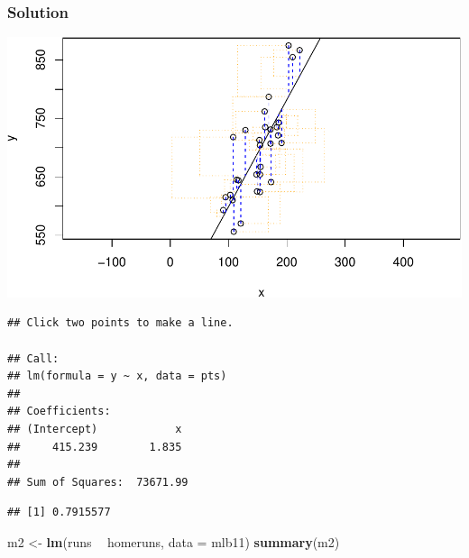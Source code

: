 \documentclass[]{article}
\newenvironment{Shaded}{\begin{snugshade}}{\end{snugshade}}
\newcommand{\KeywordTok}[1]{\textcolor[rgb]{0.13,0.29,0.53}{\textbf{#1}}}
\newcommand{\DataTypeTok}[1]{\textcolor[rgb]{0.13,0.29,0.53}{#1}}
\newcommand{\StringTok}[1]{\textcolor[rgb]{0.31,0.60,0.02}{#1}}
\newcommand{\OtherTok}[1]{\textcolor[rgb]{0.56,0.35,0.01}{#1}}
\newcommand{\OperatorTok}[1]{\textcolor[rgb]{0.81,0.36,0.00}{\textbf{#1}}}
\newcommand{\NormalTok}[1]{#1}
\begin{document}
\subsubsection{Solution}\label{solution-3}

\begin{Shaded}
\end{Shaded}

\includegraphics{DATA_606_Lab_7_files/figure-latex/unnamed-chunk-1-1.pdf}

\begin{verbatim}
## Click two points to make a line.
                                
## Call:
## lm(formula = y ~ x, data = pts)
## 
## Coefficients:
## (Intercept)            x  
##     415.239        1.835  
## 
## Sum of Squares:  73671.99
\end{verbatim}

\begin{Shaded}
\end{Shaded}

\begin{verbatim}
## [1] 0.7915577
\end{verbatim}

\begin{Shaded}
\begin{Highlighting}[]
\NormalTok{m2 <-}\StringTok{ }\KeywordTok{lm}\NormalTok{(runs }\OperatorTok{~}\StringTok{ }\NormalTok{homeruns, }\DataTypeTok{data =}\NormalTok{ mlb11)}
\KeywordTok{summary}\NormalTok{(m2)}
\end{Highlighting}
\end{Shaded}
\end{document}
